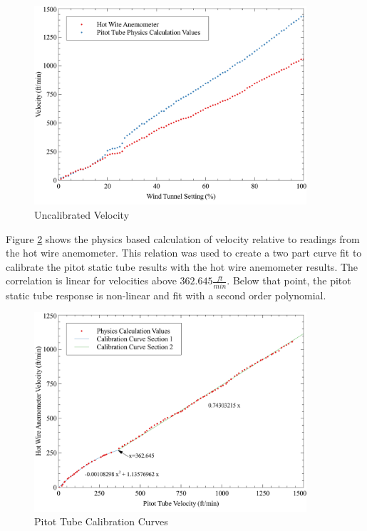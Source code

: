 \documentclass[]{article}
\begin{document}
\begin{figure}[H]
	\centering\includegraphics[width=0.9\textwidth]{cardCalibration_04}
	\caption{Uncalibrated Velocity}
	\label{fig:rawVelocity}
\end{figure}

\noindent
Figure \ref{fig:calibration} shows the physics based calculation of velocity relative to readings from the hot wire anemometer.  This relation was used to create a two part curve fit to calibrate the pitot static tube results with the hot wire anemometer results.  The correlation is linear for velocities above $362.645 \frac{ft}{min}$.  Below that point, the pitot static tube response is non-linear and fit with a second order polynomial.  

\begin{figure}[H]
	\centering\includegraphics[width=0.9\textwidth]{cardCalibration_02}
	\caption{Pitot Tube Calibration Curves}
	\label{fig:calibration}
\end{figure}
\end{document}
